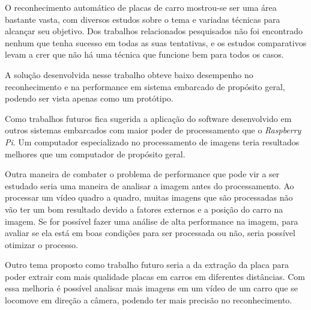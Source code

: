 O reconhecimento automático de placas de carro mostrou-se ser uma área bastante vasta, com diversos estudos sobre o tema e variadas técnicas para alcançar seu objetivo. Dos trabalhos relacionados pesquisados não foi encontrado nenhum que tenha sucesso em todas as suas tentativas, e os estudos comparativos levam a crer que não há uma técnica que funcione bem para todos os casos. 

A solução desenvolvida nesse trabalho obteve baixo desempenho no reconhecimento e na performance em sistema embarcado de propósito geral, podendo ser vista apenas como um protótipo. 

Como trabalhos futuros fica sugerida a aplicação do software desenvolvido em outros sistemas embarcados com maior poder de processamento que o \emph{Raspberry Pi}. Um computador especializado no processamento de imagens teria resultados melhores que um computador de propósito geral.

Outra maneira de combater o problema de performance que pode vir a ser estudado seria uma maneira de analisar a imagem antes do processamento. Ao processar um vídeo quadro a quadro, muitas imagens que são processadas não vão ter um bom resultado devido a fatores externos e a posição do carro na imagem. Se for possível fazer uma análise de alta performance na imagem, para avaliar se ela está em boas condições para ser processada ou não, seria possível otimizar o processo. 

Outro tema proposto como trabalho futuro seria a da extração da placa para poder extrair com mais qualidade placas em carros em diferentes distâncias. Com essa melhoria é possível analisar mais imagens em um vídeo de um carro que se locomove em direção a câmera, podendo ter mais precisão no reconhecimento.